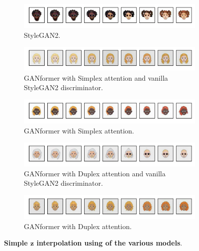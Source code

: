 \documentclass{article}
\begin{document}
\begin{figure}[htpb]
	\centering
	\begin{subfigure}{\linewidth}
		\includegraphics[width=\linewidth]{interpolation_Stylegan2_300kimg.png}
		\vspace{-7mm}
		\caption{StyleGAN2.} 
	\end{subfigure}
	\begin{subfigure}{\linewidth}
		\includegraphics[width=\linewidth]{interpolation_GANFormer_Simplex_D_Stylegan2_300kimg.png}
		\vspace{-7mm}
		\caption{GANformer with Simplex attention and vanilla StyleGAN2 discriminator.}
	\end{subfigure}
	\begin{subfigure}{\linewidth}
		\includegraphics[width=\linewidth]{interpolation_GANFormer_Simplex_D_Att_300kimg.png}
		\vspace{-7mm}
		\caption{GANformer with Simplex attention.}
	\end{subfigure}
	\begin{subfigure}{\linewidth}
		\includegraphics[width=\linewidth]{interpolation_GANFormer_Duplex_D_Stylegan2_300kimg.png}
		\vspace{-7mm}
		\caption{GANformer with Duplex attention and vanilla StyleGAN2 discriminator.}
	\end{subfigure}
	\begin{subfigure}{\linewidth}
		\includegraphics[width=\linewidth]{interpolation_GANFormer_Duplex_D_Att_300kimg.png}
		\vspace{-7mm}
		\caption{GANformer with Duplex attention.}
	\end{subfigure}
	\vspace{3mm}
	\caption{\textbf{Simple $\mathbf{z}$ interpolation using of the various models}.} 
	\label{fig:interpolation}
\end{figure}
\end{document}
